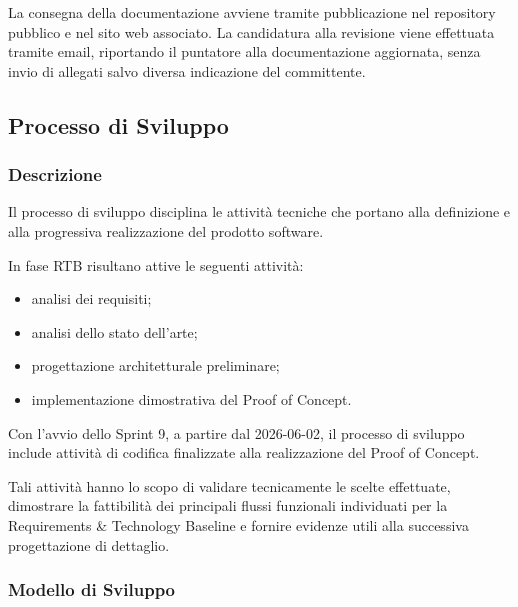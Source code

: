 La consegna della documentazione avviene tramite pubblicazione nel repository
pubblico e nel sito web associato. La candidatura alla revisione viene effettuata
tramite email, riportando il puntatore alla documentazione aggiornata, senza invio
di allegati salvo diversa indicazione del committente.


\subsection{Processo di Sviluppo}
\label{sec:sviluppo}

\subsubsection{Descrizione}

Il processo di sviluppo disciplina le attività tecniche che portano alla definizione
e alla progressiva realizzazione del prodotto software.

In fase RTB risultano attive le seguenti attività:

\begin{itemize}
    \item analisi dei requisiti;
    \item analisi dello stato dell'arte;
    \item progettazione architetturale preliminare;
    \item implementazione dimostrativa del Proof of Concept.
\end{itemize}

Con l'avvio dello Sprint 9, a partire dal 2026-06-02, il processo di sviluppo
include attività di codifica finalizzate alla realizzazione del Proof of
Concept.

Tali attività hanno lo scopo di validare tecnicamente le scelte effettuate,
dimostrare la fattibilità dei principali flussi funzionali individuati per la
Requirements \& Technology Baseline e fornire evidenze utili alla
successiva progettazione di dettaglio.


\subsubsection{Modello di Sviluppo}

